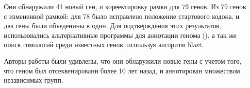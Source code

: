 Они обнаружили 41 новый ген, и кореектировку рамки для 79 генов. Из 79 генов с измененной рамкой: для 78 было исправлено положение стартового кодона, и два гены были объеденины в один. Для подтверждения этих результатов, использовались альтернативные программы для аннотации генома (), а так же поиск гомологий среди известных генов, используя алгоритм blast. 

Авторы работы были удивлены, что они обнаружили новые гены с учетом того, что геном был отсеквенированн более 10 лет назад, и аннотирован множеством независимых групп.





























\newpage
